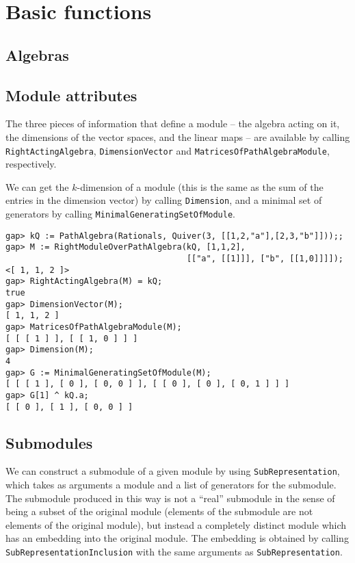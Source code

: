\documentclass{amsart}
\theoremstyle{definition}
\theoremstyle{theoretic}
\begin{document}
\section{Basic functions}
\subsection{Algebras}

\subsection{Module attributes}

The three pieces of information that define a module -- the algebra
acting on it, the dimensions of the vector spaces, and the linear maps
-- are available by calling \texttt{RightActingAlgebra},
\texttt{DimensionVector} and \texttt{MatricesOfPathAlgebraModule},
respectively.

We can get the $k$-dimension of a module (this is the same as the sum
of the entries in the dimension vector) by calling \texttt{Dimension},
and a minimal set of generators by calling
\texttt{MinimalGeneratingSetOfModule}.

\begin{verbatim}
gap> kQ := PathAlgebra(Rationals, Quiver(3, [[1,2,"a"],[2,3,"b"]]));;
gap> M := RightModuleOverPathAlgebra(kQ, [1,1,2],
                                     [["a", [[1]]], ["b", [[1,0]]]]);
<[ 1, 1, 2 ]>
gap> RightActingAlgebra(M) = kQ;
true
gap> DimensionVector(M);
[ 1, 1, 2 ]
gap> MatricesOfPathAlgebraModule(M);
[ [ [ 1 ] ], [ [ 1, 0 ] ] ]
gap> Dimension(M);
4
gap> G := MinimalGeneratingSetOfModule(M);
[ [ [ 1 ], [ 0 ], [ 0, 0 ] ], [ [ 0 ], [ 0 ], [ 0, 1 ] ] ]
gap> G[1] ^ kQ.a;
[ [ 0 ], [ 1 ], [ 0, 0 ] ]
\end{verbatim}

\subsection{Submodules}
\label{sec:submodules}

We can construct a submodule of a given module by using
\texttt{SubRepresentation}, which takes as arguments a module and a
list of generators for the submodule.  The submodule produced in this
way is not a ``real'' submodule in the sense of being a subset of the
original module (elements of the submodule are not elements of the
original module), but instead a completely distinct module which has
an embedding into the original module.  The embedding is obtained by
calling \texttt{SubRepresentationInclusion} with the same arguments as
\texttt{SubRepresentation}.
\end{document}
